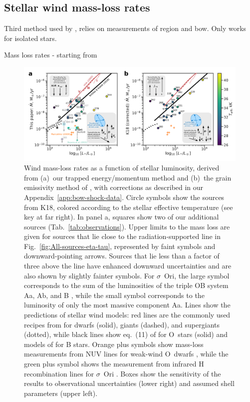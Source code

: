 \message{ !name(bs-bw-dw-03.tex)}\documentclass[useAMS, usenatbib, a4paper]{mnras}
\begin{document}
\subsection{Stellar wind mass-loss rates}
\label{sec:stellar-wind-mass}

Third method used by \citet{Gvaramadze:2012a}, relies on measurements
of \hii{} region and bow. Only works for isolated stars.

Mass loss rates - starting from \citet{Kobulnicky:2010a}

\begin{figure}
  \centering
  \includegraphics[width=\linewidth]{figs/Mdot-vs-lum-combo-edited}
  \caption{Wind mass-loss rates as a function of stellar luminosity,
    derived from (a)~our trapped energy/momentum method and (b)~the
    grain emissivity method of \citet{Kobulnicky:2018a}, with
    corrections as described in our Appendix~\ref{app:bow-shock-data}.
    Circle symbols show the sources from K18, colored according to the
    stellar effective temperature (see key at far right). In panel a,
    squares show two of our additional sources
    (Tab.~\ref{tab:observations}). Upper limits to the mass loss are
    given for sources that lie close to the radiation-supported line
    in Fig.~\ref{fig:All-sources-eta-tau}, represented by faint
    symbols and downward-pointing arrows.  Sources that lie less than
    a factor of three above the line have enhanced downward
    uncertainties and are also shown by slightly fainter symbols.  For
    \(\sigma\)~Ori, the large symbol corresponds to the sum of the
    luminosities of the triple OB system Aa, Ab, and B
    \citep{Simon-Diaz:2015a}, while the small symbol corresponds to
    the luminosity of only the most massive component Aa.  Lines show
    the predictions of stellar wind models: red lines are the commonly
    used recipes from \citet{Vink:2000a} for dwarfs (solid), giants
    (dashed), and supergiants (dotted), while black lines show
    eq.~(11) of \citet{Krticka:2017a} for O~stars (solid) and models
    of \citet{Krticka:2014a} for B stars.  Orange plus symbols show
    mass-loss measurements from NUV lines for weak-wind O~dwarfs
    \citep{Marcolino:2009a}, while the green plus symbol shows the
    measurement from infrared H recombination lines for \(\sigma\)~Ori
    \citep{Najarro:2011a}.  Boxes show the sensitivity of the results
    to observational uncertainties (lower right) and assumed shell
    parameters (upper left).}
  \label{fig:mass-loss-vs-luminosity}
\end{figure}
\end{document}
